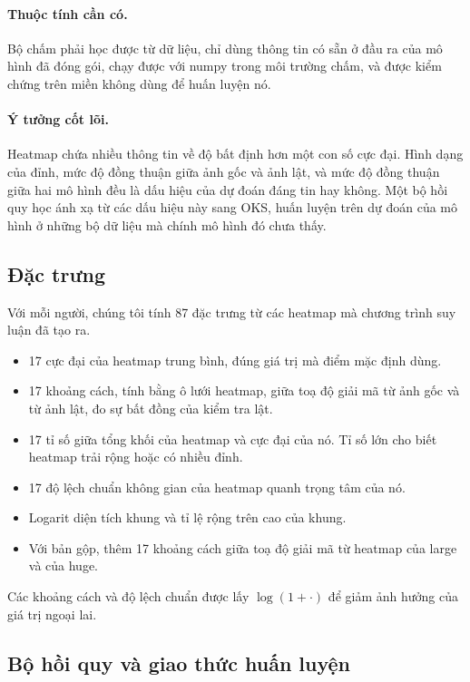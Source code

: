 \documentclass[11pt,a4paper]{article}
\begin{document}
\paragraph{Thuộc tính cần có.} Bộ chấm phải học được từ dữ liệu, chỉ dùng thông tin có sẵn ở đầu ra của mô hình đã đóng gói, chạy được với numpy trong môi trường chấm, và được kiểm chứng trên miền không dùng để huấn luyện nó.

\paragraph{Ý tưởng cốt lõi.} Heatmap chứa nhiều thông tin về độ bất định hơn một con số cực đại. Hình dạng của đỉnh, mức độ đồng thuận giữa ảnh gốc và ảnh lật, và mức độ đồng thuận giữa hai mô hình đều là dấu hiệu của dự đoán đáng tin hay không. Một bộ hồi quy học ánh xạ từ các dấu hiệu này sang OKS, huấn luyện trên dự đoán của mô hình ở những bộ dữ liệu mà chính mô hình đó chưa thấy.

\subsection{Đặc trưng}

Với mỗi người, chúng tôi tính 87 đặc trưng từ các heatmap mà chương trình suy luận đã tạo ra.

\begin{itemize}[leftmargin=1.4em]
\item 17 cực đại của heatmap trung bình, đúng giá trị mà điểm mặc định dùng.
\item 17 khoảng cách, tính bằng ô lưới heatmap, giữa toạ độ giải mã từ ảnh gốc và từ ảnh lật, đo sự bất đồng của kiểm tra lật.
\item 17 tỉ số giữa tổng khối của heatmap và cực đại của nó. Tỉ số lớn cho biết heatmap trải rộng hoặc có nhiều đỉnh.
\item 17 độ lệch chuẩn không gian của heatmap quanh trọng tâm của nó.
\item Logarit diện tích khung và tỉ lệ rộng trên cao của khung.
\item Với bản gộp, thêm 17 khoảng cách giữa toạ độ giải mã từ heatmap của large và của huge.
\end{itemize}

Các khoảng cách và độ lệch chuẩn được lấy $\log(1+\cdot)$ để giảm ảnh hưởng của giá trị ngoại lai.

\subsection{Bộ hồi quy và giao thức huấn luyện}
\end{document}
